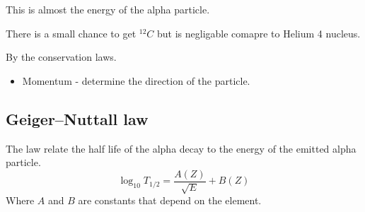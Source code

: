 \documentclass[11pt,a4paper]{article}
\begin{document}
This is almost the energy of the alpha particle.

There is a small chance to get $^{12}C$ but is negligable comapre
to Helium 4 nucleus.

By the conservation laws.
\begin{itemize}
    \item Momentum - determine the direction of the particle.
\end{itemize}

\subsection{Geiger–Nuttall law}

The law relate the half life of the alpha decay to the energy of the emitted alpha particle.
\begin{equation}
    {\displaystyle \log_{10}T_{1/2}={\frac{A(Z)}{\sqrt{E}}}+B(Z)}
\end{equation}
Where $A$ and $B$ are constants that depend on the element.
\end{document}
